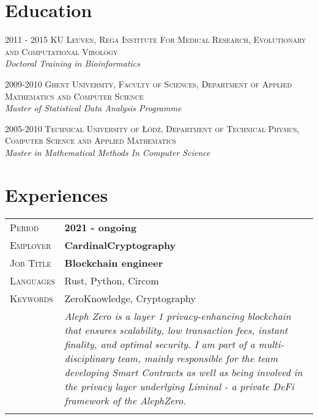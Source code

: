 \documentclass[a4paper, oneside, final]{scrartcl}
\newenvironment{lyxlist}[1]
{\begin{list}{}
{\settowidth{\labelwidth}{#1}
 \setlength{\leftmargin}{\labelwidth}
 \addtolength{\leftmargin}{\labelsep}
 \renewcommand{\makelabel}[1]{##1\hfil}}}
{\end{list}}
\newcommand{\noun}[1]{\textsc{#1}}
\newcommand{\gray}{\rowcolor[gray]{.90}}
\begin{document}


\begin{center}
\section{Education}

\begin{lyxlist}{00.00.0000}
\item [{\noun{\scriptsize 2011 - 2015}}] \noun{KU Leuven,
Rega Institute For Medical Research, Evolutionary and Computational Virology }\\
\emph{Doctoral Training in Bioinformatics}
\item [{\noun{\scriptsize 2009-2010}}] \noun{Ghent University, Faculty
of Sciences, Department of Applied Mathematics and Computer Science}\\
\emph{Master of Statistical Data Analysis Programme}
\item [{\noun{\scriptsize 2005-2010}}] \noun{Technical University of \L{}ód\'{z},
Department of Technical Physics, Computer Science and Applied Mathematics}\\
\emph{Master in Mathematical Methods In Computer Science}
\end{lyxlist}

\section{Experiences}
\vspace{-8pt}

\begin{tabularx}{0.97\linewidth}{>{\raggedleft\scshape}p{2cm}X}

\gray Period    & \textbf{2021 - ongoing}\\
\gray Employer  & \textbf{CardinalCryptography} \\
\gray Job Title & \textbf{Blockchain engineer}\\
\gray Languages & Rust, Python, Circom\\
\gray Keywords & ZeroKnowledge, Cryptography \\
\gray           &  {\textit{
Aleph Zero is a layer 1 privacy-enhancing blockchain that ensures scalability, low transaction fees, instant finality, and optimal security.
I am part of a multi-disciplinary team, mainly responsible for the team developing Smart Contracts as well as being involved in the privacy layer underlying Liminal - a private DeFi framework of the AlephZero.
}}\\ \\


\end{tabularx}
\end{center}
\end{document}
